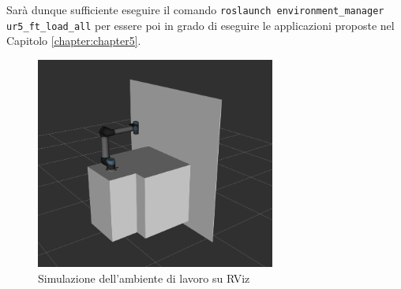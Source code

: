 Sar\`{a} dunque sufficiente eseguire il comando \verb|roslaunch environment_manager ur5_ft_load_all| per essere poi in grado di 
eseguire le applicazioni proposte nel Capitolo \ref{chapter:chapter5}. 
\begin{figure}[H]
    \centering
    \includegraphics*[width=0.70\textwidth]{images/workcell.png}
    \caption{Simulazione dell'ambiente di lavoro su RViz}
    \label{fig:workcell}
\end{figure}